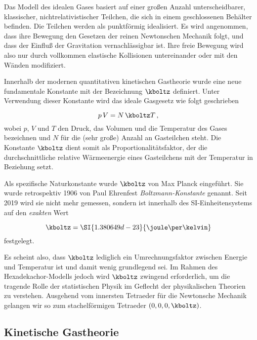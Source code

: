 
\newpage {}
\label{sec:0001}

Das Modell des idealen Gases basiert auf einer großen Anzahl unterscheidbarer, klassischer, nichtrelativistischer Teilchen, die sich in einem geschlossenen Behälter befinden. Die Teilchen werden als punktförmig idealisiert. Es wird angenommen, dass ihre Bewegung den Gesetzen der reinen Newtonschen Mechanik folgt, und dass der Einfluß der Gravitation vernachlässigbar ist. Ihre freie Bewegung wird also nur durch vollkommen elastische Kollisionen untereinander oder mit den Wänden modifiziert.

Innerhalb der modernen quantitativen kinetischen Gastheorie wurde eine neue fundamentale Konstante mit der Bezeichnung $\kboltz$ definiert. Unter Verwendung dieser Konstante wird das ideale Gasgesetz wie folgt geschrieben

\begin{equation*}\label{eq:ideal-kb}
  p\, V=N\, \kboltz T\,,
\end{equation*}
%
wobei $p$, $V$ und $T$ den Druck, das Volumen und die Temperatur des Gases bezeichnen und $N$ für die (sehr große) Anzahl an Gasteilchen steht. Die Konstante $\kboltz$ dient somit als Proportionalitätsfaktor, der die durchschnittliche relative Wärmeenergie eines Gasteilchens mit der Temperatur in Beziehung setzt.

Als spezifische Naturkonstante wurde $\kboltz$ von Max Planck eingeführt. Sie wurde retrospektiv 1906 von Paul Ehrenfest \emph{Boltzmann-Konstante} genannt. Seit 2019 wird sie nicht mehr gemessen, sondern ist innerhalb des SI-Einheitensystems auf den \emph{exakten} Wert

\begin{equation*}
  \kboltz=\SI{1.380649d-23}{\joule \per \kelvin}
\end{equation*}
%
festgelegt.

Es scheint also, dass $\kboltz$ lediglich ein Umrechnungsfaktor zwischen Energie und Temperatur ist und damit wenig grundlegend sei. Im Rahmen des Hexadekachor-Modells jedoch wird $\kboltz$ zwingend erforderlich, um die tragende Rolle der statistischen Physik im Geflecht der physikalischen Theorien zu verstehen. Ausgehend vom innersten Tetraeder für die Newtonsche Mechanik gelangen wir so zum stachelförmigen Tetraeder $(0,0,0,\kboltz)$.


\subsection*{Kinetische Gastheorie}

